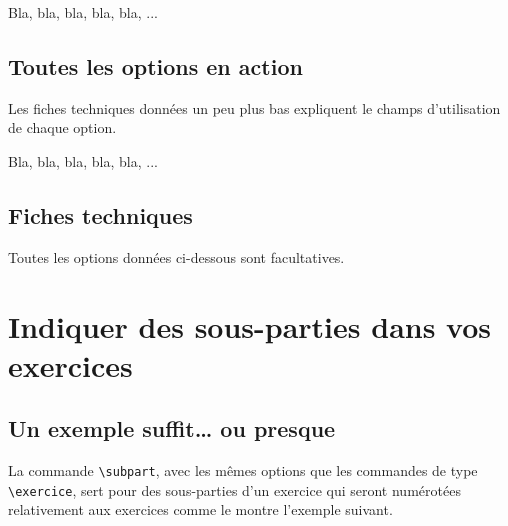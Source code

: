\documentclass[12pt,a4paper]{scrartcl}
\begin{document}
\begin{tcblisting}{}
\exercise*[title = Juste mon titre]

Bla, bla, bla, bla, bla, ...
\end{tcblisting}


    \subsection{Toutes les options en action}

Les fiches techniques données un peu plus bas expliquent le champs d'utilisation de chaque option.

\begin{tcblisting}{}
\exercise[pts   = 0,
          time  = 3 jours,
          id    = facultatif,
          title = Devinette,
          about = Pour spécialistes uniquement,
          src   = Le livre des experts]
Bla, bla, bla, bla, bla, ...
\end{tcblisting}


    \subsection{Fiches techniques}

Toutes les options données ci-dessous sont facultatives.

\bigskip








\exosoptions{}



\section{Indiquer des sous-parties dans vos exercices}

    \subsection{Un exemple suffit\dots{} ou presque}

La commande \verb+\subpart+, avec les mêmes options que les commandes de type \verb+\exercice+, sert pour des sous-parties d'un exercice qui seront numérotées relativement aux exercices comme le montre l'exemple suivant.
\end{document}
